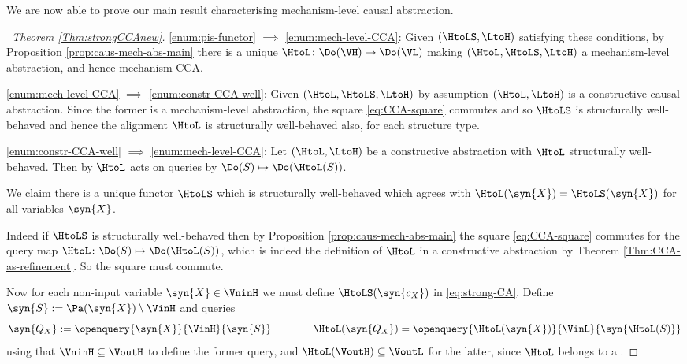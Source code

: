 \documentclass{article}
\begin{document}
{We are now able to prove our main result characterising mechanism-level causal abstraction.

\begin{proof}[\proofof~Theorem \ref{Thm:strongCCAnew}]

\eqref{enum:pis-functor} $\implies$ \eqref{enum:mech-level-CCA}:
Given $(\HtoLS, \LtoH)$ satisfying these conditions, by Proposition \ref{prop:caus-mech-abs-main} there is a unique $\HtoL \colon \Do(\VH) \to \Do(\VL)$ making $(\HtoL, \HtoLS, \LtoH)$ a mechanism-level abstraction, and hence mechanism CCA. 

\eqref{enum:mech-level-CCA} $\implies$ \eqref{enum:constr-CCA-well}:
Given $(\HtoL, \HtoLS, \LtoH)$ by assumption $(\HtoL, \LtoH)$ is a constructive causal abstraction. Since the former is a mechanism-level abstraction, the square 
\eqref{eq:CCA-square} commutes and so $\HtoLS$ is structurally well-behaved and hence the alignment $\HtoL$ is structurally well-behaved also, for each structure type. 

\eqref{enum:constr-CCA-well} $\implies$ \eqref{enum:mech-level-CCA}:
Let $(\HtoL, \LtoH)$ be a constructive abstraction with $\HtoL$ structurally well-behaved. Then by  $\HtoL$ acts on queries by $\Do(S) \mapsto \Do(\HtoL(S))$. 

We claim there is a unique functor $\HtoLS$ which is structurally well-behaved which agrees with $\HtoL(\syn{X}) = \HtoLS(\syn{X})$ for all variables $\syn{X}$. 

Indeed if $\HtoLS$ is structurally well-behaved then by Proposition \ref{prop:caus-mech-abs-main} the square \eqref{eq:CCA-square} commutes for the query map $\HtoL \colon \Do(S) \mapsto \Do(\HtoL(S))$, which is indeed the definition of $\HtoL$ in a constructive abstraction by Theorem \ref{Thm:CCA-as-refinement}. So the square must commute. 

Now for each non-input variable $\syn{X} \in \VninH$ we must define $\HtoLS(\syn{c_X})$ in \eqref{eq:strong-CA}. Define $\syn{S} := \Pa(\syn{X}) \setminus \VinH$ and queries
\begin{equation} \label{eq:Q-useful}
\syn{Q_X} := {\openquery{\syn{X}}{\VinH}{\syn{S}}} \qquad \qquad \HtoL(\syn{Q_X}) = {\openquery{\HtoL(\syn{X})}{\VinL}{\syn{\HtoL(S)}}}
\end{equation}
using that $\VninH \subseteq \VoutH$ to define the former query, and $\HtoL(\VoutH) \subseteq \VoutL$ for the latter, since $\HtoL$ belongs to a \varalign. 


\end{proof}}
\end{document}
